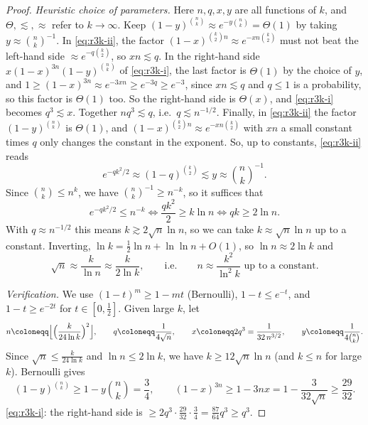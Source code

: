 \begin{proof}
    \emph{Heuristic choice of parameters.} Here \(n, q, x, y\) are all functions of \(k\), and \(\Theta, \lesssim, \approx\) refer to \(k \to \infty\). Keep \((1-y)^{\binom{n}{k}} \approx e^{-y \binom{n}{k}} = \Theta(1)\) by taking \(y \approx \binom{n}{k}^{-1}\). In \eqref{eq:r3k-ii}, the factor \((1-x)^{\binom{k}{2} n} \approx e^{-x n \binom{k}{2}}\) must not beat the left-hand side \(\approx e^{-q \binom{k}{2}}\), so \(x n \lesssim q\). In the right-hand side \(x (1-x)^{3n} (1-y)^{\binom{n}{k}}\) of \eqref{eq:r3k-i}, the last factor is \(\Theta(1)\) by the choice of \(y\), and \(1 \ge (1-x)^{3n} \approx e^{-3xn} \ge e^{-3q} \ge e^{-3}\), since \(xn \lesssim q\) and \(q \le 1\) is a probability, so this factor is \(\Theta(1)\) too. So the right-hand side is \(\Theta(x)\), and \eqref{eq:r3k-i} becomes \(q^{3} \lesssim x\). Together \(n q^{3} \lesssim q\), i.e.\ \(q \lesssim n^{-1/2}\). Finally, in \eqref{eq:r3k-ii} the factor \((1-y)^{\binom{n}{k}}\) is \(\Theta(1)\), and \((1-x)^{\binom{k}{2} n} \approx e^{-xn \binom{k}{2}}\) with \(xn\) a small constant times \(q\) only changes the constant in the exponent. So, up to constants, \eqref{eq:r3k-ii} reads
    \[
        e^{-q k^{2}/2} \approx (1-q)^{\binom{k}{2}} \lesssim y \approx \binom{n}{k}^{-1} .
    \]
    Since \(\binom{n}{k} \le n^{k}\), we have \(\binom{n}{k}^{-1} \ge n^{-k}\), so it suffices that
    \[
        e^{-q k^{2}/2} \le n^{-k}
        \iff \frac{q k^{2}}{2} \ge k \ln n
        \iff q k \ge 2 \ln n .
    \]
    With \(q \approx n^{-1/2}\) this means \(k \gtrsim 2 \sqrt{n} \ln n\), so we can take \(k \approx \sqrt{n} \ln n\) up to a constant. Inverting, \(\ln k = \frac{1}{2} \ln n + \ln \ln n + O(1)\), so \(\ln n \approx 2 \ln k\) and
    \[
        \sqrt{n} \approx \frac{k}{\ln n} \approx \frac{k}{2 \ln k},
        \qquad\text{i.e.}\qquad
        n \approx \frac{k^{2}}{\ln^{2} k} \text{ up to a constant}.
    \]

    \emph{Verification.} We use \((1-t)^{m} \ge 1 - mt\) (Bernoulli), \(1 - t \le e^{-t}\), and \(1 - t \ge e^{-2t}\) for \(t \in [0, \frac{1}{2}]\). Given large \(k\), let
    \[
        n \coloneqq \Bigl\lfloor \Bigl( \frac{k}{24 \ln k} \Bigr)^{2} \Bigr\rfloor,
        \qquad
        q \coloneqq \frac{1}{4\sqrt{n}}, \qquad
        x \coloneqq 2 q^{3} = \frac{1}{32 \, n^{3/2}}, \qquad
        y \coloneqq \frac{1}{4 \binom{n}{k}} .
    \]
    Since \(\sqrt{n} \le \frac{k}{24 \ln k}\) and \(\ln n \le 2 \ln k\), we have \(k \ge 12 \sqrt{n} \ln n\) (and \(k \le n\) for large \(k\)). Bernoulli gives
    \[
        (1-y)^{\binom{n}{k}} \ge 1 - y \binom{n}{k} = \frac{3}{4},
        \qquad
        (1-x)^{3n} \ge 1 - 3 n x = 1 - \frac{3}{32 \sqrt{n}} \ge \frac{29}{32} .
    \]
    \eqref{eq:r3k-i}: the right-hand side is \(\ge 2 q^{3} \cdot \frac{29}{32} \cdot \frac{3}{4} = \frac{87}{64} q^{3} \ge q^{3}\).


\end{proof}
